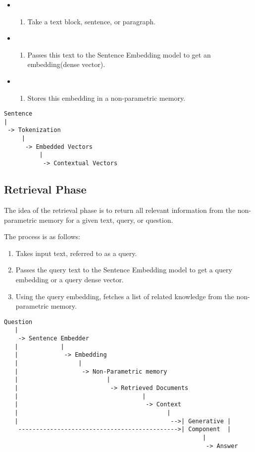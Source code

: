 \documentclass{wseas}
\begin{document}
\begin{itemize}
\item
  \begin{enumerate}
  \def\labelenumi{\arabic{enumi}.}
  \item
    Take a text block, sentence, or paragraph.
  \end{enumerate}
\item
  \begin{enumerate}
  \def\labelenumi{\arabic{enumi}.}
  \setcounter{enumi}{1}
  \item
    Passes this text to the Sentence Embedding model to get an
    embedding(dense vector).
  \end{enumerate}
\item
  \begin{enumerate}
  \def\labelenumi{\arabic{enumi}.}
  \setcounter{enumi}{2}
  \item
    Stores this embedding in a non-parametric memory.
  \end{enumerate}
\end{itemize}
\begin{verbatim}
Sentence
|
 -> Tokenization
     |
      -> Embedded Vectors
          |
           -> Contextual Vectors
\end{verbatim}


\subsection{Retrieval Phase}

The idea of the retrieval phase is to return all relevant information
from the non-parametric memory for a given text, query, or question.

The process is as follows:

\begin{enumerate}
\def\labelenumi{\arabic{enumi}.}
\item
  Takes input text, referred to as a query.
\item
  Passes the query text to the Sentence Embedding model to get a query
  embedding or a query dense vector.
\item
  Using the query embedding, fetches a list of related knowledge from
  the non-parametric memory.
\end{enumerate}

\begin{verbatim}
Question 
   |
    -> Sentence Embedder 
   |            | 
   |             -> Embedding 
   |                 |
   |                  -> Non-Parametric memory 
   |                         |
   |                          -> Retrieved Documents
   |                                   |
   |                                    -> Context
   |                                          | 
   |                                           -->| Generative |
    --------------------------------------------->| Component  |
                                                        |
                                                         -> Answer
\end{verbatim}
\end{document}
